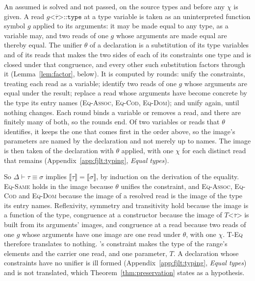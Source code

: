 An assumed  is solved and not passed, on the source types and before any $\chi$ is given.
A read $g\texttt{<}\overline{\tau}\texttt{>::type}$ at a type variable is taken as an uninterpreted function symbol $g$ applied to its arguments: it may be made equal to any type, as a variable may, and two reads of one $g$ whose arguments are made equal are thereby equal.
The unifier $\theta$ of a declaration is a substitution of its type variables and of its reads that makes the two sides of each of its  constraints one type and is closed under that congruence, and every other such substitution factors through it (Lemma~\ref{lem:factor}, below).
It is computed by rounds: unify the constraints, treating each read as a variable; identify two reads of one $g$ whose arguments are equal under the result; replace a read whose arguments have become concrete by the type its entry names (\textsc{Eq-Assoc}, \textsc{Eq-Cod}, \textsc{Eq-Dom}); and unify again, until nothing changes.
Each round binds a variable or removes a read, and there are finitely many of both, so the rounds end.
Of two variables or reads that $\theta$ identifies, it keeps the one that comes first in the order above, so the image's parameters are named by the declaration and not merely up to names.
The image is then taken of the declaration with $\theta$ applied, with one $\chi$ for each distinct read that remains (Appendix~\ref{app:fjlt:typing}, \emph{Equal types}).

So $\Delta \vdash \tau \equiv \sigma$ implies $\llbracket \tau \rrbracket = \llbracket \sigma \rrbracket$, by induction on the derivation of the equality.
\textsc{Eq-Same} holds in the image because $\theta$ unifies the constraint, and \textsc{Eq-Assoc}, \textsc{Eq-Cod} and \textsc{Eq-Dom} because the image of a resolved read is the image of the type its entry names.
Reflexivity, symmetry and transitivity hold because the image is a function of the type, congruence at a constructor because the image of $T\texttt{<}\overline{\tau}\texttt{>}$ is built from its arguments' images, and congruence at a read because two reads of one $g$ whose arguments have one image are one read under $\theta$, with one $\chi$.
\textsc{T-Eq} therefore translates to nothing.
's constraint  makes the type of the range's elements and the carrier one read, and one parameter, $T$.
A declaration whose  constraints have no unifier is ill formed (Appendix~\ref{app:fjlt:typing}, \emph{Equal types}) and is not translated, which Theorem~\ref{thm:preservation} states as a hypothesis.

